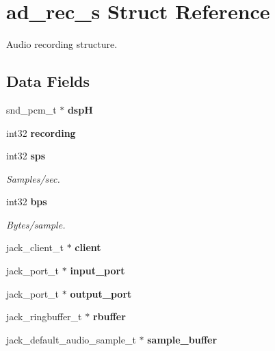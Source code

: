 \section{ad\-\_\-rec\-\_\-s Struct Reference}
\label{structad__rec__s}


Audio recording structure.  


\subsection*{Data Fields}
\begin{DoxyCompactItemize}
\item 
snd\-\_\-pcm\-\_\-t $\ast$ {\bfseries dsp\-H}\label{structad__rec__s_af4b2cd7de40e5b2a48d2d6878d33cc18}

\item 
int32 {\bfseries recording}\label{structad__rec__s_a5ddf90deb3806752a1fa3152fe864047}

\item 
int32 {\bf sps}\label{structad__rec__s_a2c5120af44acf19c5c7c63778bc932a3}

\begin{DoxyCompactList}\small\item\em Samples/sec. \end{DoxyCompactList}\item 
int32 {\bf bps}\label{structad__rec__s_a731523ef22607a580877bdcc563d9e5e}

\begin{DoxyCompactList}\small\item\em Bytes/sample. \end{DoxyCompactList}\item 
jack\-\_\-client\-\_\-t $\ast$ {\bfseries client}\label{structad__rec__s_acd700500a367b0cb21306b7152f723af}

\item 
jack\-\_\-port\-\_\-t $\ast$ {\bfseries input\-\_\-port}\label{structad__rec__s_a3acb1e45a779726ee6370ee4f773ed12}

\item 
jack\-\_\-port\-\_\-t $\ast$ {\bfseries output\-\_\-port}\label{structad__rec__s_aa063dd1156101f957df117a0cd2407be}

\item 
jack\-\_\-ringbuffer\-\_\-t $\ast$ {\bfseries rbuffer}\label{structad__rec__s_a39c7bd9b729d4ec0da0bd2c9cfa5e240}

\item 
jack\-\_\-default\-\_\-audio\-\_\-sample\-\_\-t $\ast$ {\bfseries sample\-\_\-buffer}\label{structad__rec__s_a4118f000ae396de0faca9cbf07c2ee61}


\end{DoxyCompactItemize}
